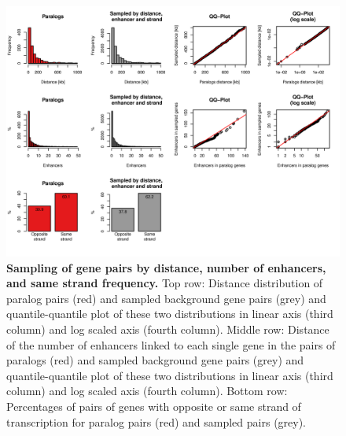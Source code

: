 \documentclass[a4paper,twoside=true,openright,parskip=full,chapterprefix=true,11pt,headings=normal,bibliography=totoc,listof=totoc,titlepage=on,captions=tableabove,draft=false]{scrreprt}
\theoremstyle{definition}
\theoremstyle{definition}
\theoremstyle{definition}
\theoremstyle{remark}
\begin{document}
\begin{figure}

{\centering \includegraphics[width=0.8\linewidth]{figures/paralog/SI/figS5} 

}

\caption{\textbf{Sampling of gene pairs by distance,
number of enhancers, and same strand frequency.} Top row: Distance
distribution of paralog pairs (red) and sampled background gene pairs
(grey) and quantile-quantile plot of these two distributions in linear
axis (third column) and log scaled axis (fourth column). Middle row:
Distance of the number of enhancers linked to each single gene in the
pairs of paralogs (red) and sampled background gene pairs (grey) and
quantile-quantile plot of these two distributions in linear axis (third
column) and log scaled axis (fourth column). Bottom row: Percentages of
pairs of genes with opposite or same strand of transcription for paralog
pairs (red) and sampled pairs (grey).}\label{fig:samplingDistEhStrand}
\end{figure}
\end{document}
